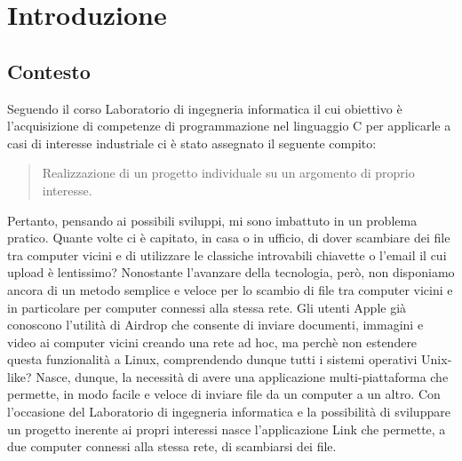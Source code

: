 \documentclass[11pt,fleqn]{book} %
\begin{document}

\pagestyle{empty} %

\tableofcontents %


\pagestyle{fancy} %



\chapter{Introduzione}

\section{Contesto}

Seguendo il corso Laboratorio di ingegneria informatica il cui obiettivo è l'acquisizione di competenze di programmazione nel linguaggio C per applicarle a casi di interesse industriale ci è stato assegnato il seguente compito:

\begin{quote}
Realizzazione di un progetto individuale su un argomento di proprio interesse.
\end{quote}

Pertanto, pensando ai possibili sviluppi, mi sono imbattuto in un problema pratico.
Quante volte ci è capitato, in casa o in ufficio, di dover scambiare dei file tra computer vicini e di utilizzare le classiche introvabili chiavette o l'email il cui upload è lentissimo?
Nonostante l'avanzare della tecnologia, però, non disponiamo ancora di un metodo semplice e veloce per lo scambio di file tra computer vicini e in particolare per computer connessi alla stessa rete.
Gli utenti Apple già conoscono l'utilità di Airdrop che consente di inviare documenti, immagini e video ai computer vicini creando una rete ad hoc, ma perchè non estendere questa funzionalità a Linux, comprendendo dunque tutti i sistemi operativi Unix-like?
Nasce, dunque, la necessità di avere una applicazione multi-piattaforma che permette, in modo facile e veloce di inviare file da un computer a un altro.
Con l'occasione del Laboratorio di ingegneria informatica e la possibilità di sviluppare un progetto inerente ai propri interessi nasce l'applicazione Link che permette, a due computer connessi alla stessa rete, di scambiarsi dei file.
\end{document}
